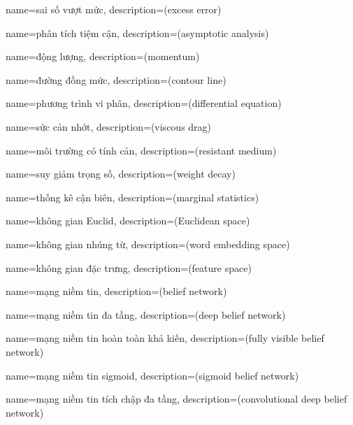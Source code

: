 {
    name={sai số vượt mức},
    description={(excess error)}
}

{
    name={phân tích tiệm cận},
    description={(asymptotic analysis)}
}

{
    name={động lượng},
    description={(momentum)}
}

{
    name={đường đồng mức},
    description={(contour line)}
}

{
    name={phương trình vi phân},
    description={(diﬀerential equation)}
}

{
    name={sức cản nhớt},
    description={(viscous drag)}
}

{
    name={môi trường có tính cản},
    description={(resistant medium)}
}

{
    name={suy giảm trọng số},
    description={(weight decay)}
}

{
    name={thống kê cận biên},
    description={(marginal statistics)}
}

{
    name={không gian Euclid},
    description={(Euclidean space)}
}

{
    name={không gian nhúng từ},
    description={(word embedding space)}
}

{
    name={không gian đặc trưng},
    description={(feature space)}
}

{
    name={mạng niềm tin},
    description={(belief network)}
}

{
    name={mạng niềm tin đa tầng},
    description={(deep belief network)}
}


{
    name={mạng niềm tin hoàn toàn khả kiến},
    description={(fully visible belief network)}
}

{
    name={mạng niềm tin sigmoid},
    description={(sigmoid belief network)}
}

{
    name={mạng niềm tin tích chập đa tầng},
    description={(convolutional deep belief network)}
}

